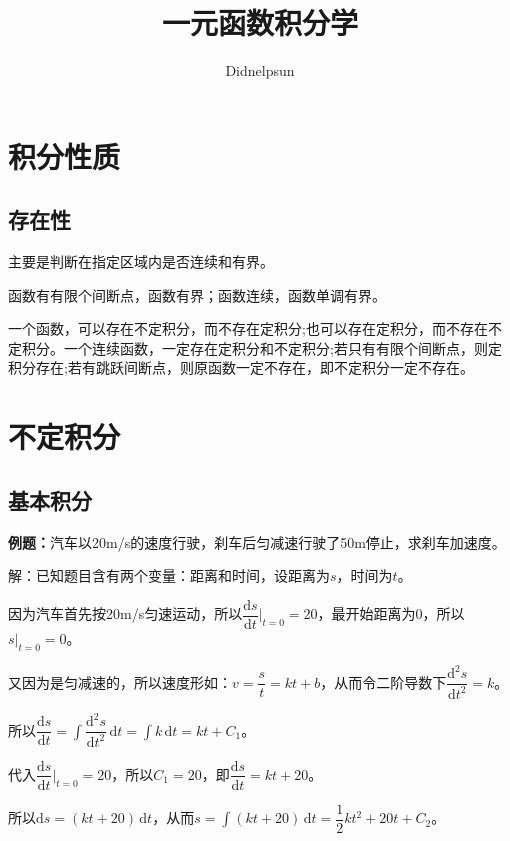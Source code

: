 \documentclass[UTF8, 12pt]{ctexart}
\author{Didnelpsun}
\title{一元函数积分学}
\date{}
\begin{document}
\maketitle
\pagestyle{empty}
\thispagestyle{empty}
\tableofcontents
\thispagestyle{empty}
\newpage
\pagestyle{plain}
\setcounter{page}{1}
\section{积分性质}

\subsection{存在性}

主要是判断在指定区域内是否连续和有界。

函数有有限个间断点，函数有界；函数连续，函数单调有界。

一个函数，可以存在不定积分，而不存在定积分;也可以存在定积分，而不存在不定积分。一个连续函数，一定存在定积分和不定积分;若只有有限个间断点，则定积分存在;若有跳跃间断点，则原函数一定不存在，即不定积分一定不存在。

\section{不定积分}
\subsection{基本积分}

\textbf{例题：}汽车以20m/s的速度行驶，刹车后匀减速行驶了50m停止，求刹车加速度。

解：已知题目含有两个变量：距离和时间，设距离为$s$，时间为$t$。

因为汽车首先按20m/s匀速运动，所以$\dfrac{\textrm{d}s}{\textrm{d}t}\bigg\vert_{t=0}=20$，最开始距离为0，所以$s\vert_{t=0}=0$。

又因为是匀减速的，所以速度形如：$v=\dfrac{s}{t}=kt+b$，从而令二阶导数下$\dfrac{\textrm{d}^2s}{\textrm{d}t^2}=k$。

所以$\displaystyle{\dfrac{\textrm{d}s}{\textrm{d}t}=\int\dfrac{\textrm{d}^2s}{\textrm{d}t^2}\,\textrm{d}t=\int k\,\textrm{d}t}=kt+C_1$。

代入$\dfrac{\textrm{d}s}{\textrm{d}t}\bigg\vert_{t=0}=20$，所以$C_1=20$，即$\dfrac{\textrm{d}s}{\textrm{d}t}=kt+20$。

所以$\textrm{d}s=(kt+20)\,\textrm{d}t$，从而$s=\displaystyle{\int(kt+20)\,\textrm{d}t}=\dfrac{1}{2}kt^2+20t+C_2$。
\end{document}
